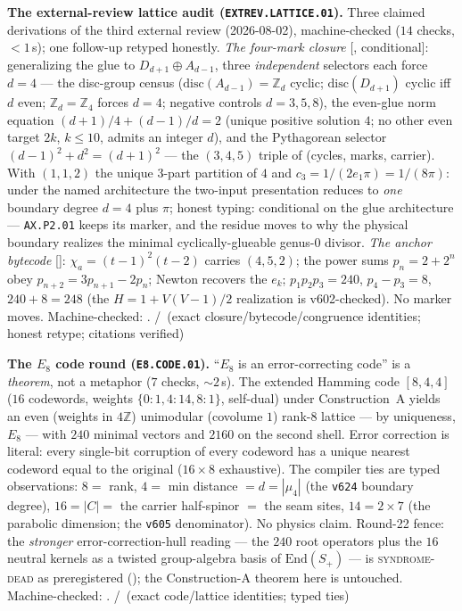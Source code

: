 \documentclass[11pt,a4paper]{article}
\theoremstyle{definition}
\begin{document}
\par\smallskip\noindent\textbf{The external-review lattice audit
(\texttt{EXTREV.LATTICE.01}).}
Three claimed derivations of the third external review (2026-08-02),
machine-checked ($14$ checks, ${<}1$\,s); one follow-up retyped
honestly.  \emph{The four-mark closure} [\mE, conditional]:
generalizing the glue to $D_{d+1}\oplus A_{d-1}$, three
\emph{independent} selectors each force $d=4$ --- the disc-group
census ($\mathrm{disc}(A_{d-1})=\mathbb Z_d$ cyclic;
$\mathrm{disc}(D_{d+1})$ cyclic iff $d$ even; $\mathbb Z_d=\mathbb
Z_4$ forces $d=4$; negative controls $d=3,5,8$), the even-glue norm
equation $(d{+}1)/4+(d{-}1)/d=2$ (unique positive solution $4$; no
other even target $2k$, $k\le10$, admits an integer $d$), and the
Pythagorean selector $(d{-}1)^2+d^2=(d{+}1)^2$ --- the $(3,4,5)$
triple of (cycles, marks, carrier).  With $(1,1,2)$ the unique
3-part partition of $4$ and $c_3=1/(2e_1\pi)=1/(8\pi)$: under the
named architecture the two-input presentation reduces to \emph{one}
boundary degree $d=4$ plus $\pi$; honest typing: conditional on the
glue architecture --- \texttt{AX.P2.01} keeps its marker, and the
residue moves to why the physical boundary realizes the minimal
cyclically-glueable genus-0 divisor.  \emph{The anchor bytecode}
[\mE]: $\chi_a=(t{-}1)^2(t{-}2)$ carries $(4,5,2)$; the power sums
$p_n=2+2^n$ obey $p_{n+2}=3p_{n+1}-2p_n$; Newton recovers the $e_k$;
$p_1p_2p_3=240$, $p_4-p_3=8$, $240+8=248$ (the $H=1+V(V{-}1)/2$
realization is v602-checked).  No marker moves.
Machine-checked: .
\mE/\mC\ (exact closure/bytecode/congruence identities; honest
retype; citations verified)
\par\smallskip

\par\smallskip\noindent\textbf{The $E_8$ code round
(\texttt{E8.CODE.01}).}
``$E_8$ is an error-correcting code'' is a \emph{theorem}, not a
metaphor ($7$ checks, ${\sim}2$\,s).  The extended Hamming code
$[8,4,4]$ ($16$ codewords, weights $\{0{:}1,4{:}14,8{:}1\}$, self-dual)
under Construction~A yields an even (weights in $4\mathbb Z$)
unimodular (covolume $1$) rank-$8$ lattice --- by uniqueness, $E_8$ ---
with $240$ minimal vectors and $2160$ on the second shell.  Error correction is
literal: every single-bit corruption of every codeword has a unique
nearest codeword equal to the original ($16\times8$ exhaustive).  The
compiler ties are typed observations: $8=$ rank, $4=$ min distance
$=d=|\mu_4|$ (the \texttt{v624} boundary degree), $16=|C|=$ the carrier
half-spinor $=$ the seam sites, $14=2\times7$ (the parabolic dimension;
the \texttt{v605} denominator).  No physics claim.  Round-22 fence:
the \emph{stronger} error-correction-hull reading --- the $240$ root
operators plus the $16$ neutral kernels as a twisted group-algebra
basis of $\mathrm{End}(S_+)$ --- is \textsc{syndrome-dead} as
preregistered (); the
Construction-A theorem here is untouched.
Machine-checked: .
\mE/\mC\ (exact code/lattice identities; typed ties)
\par\smallskip
\end{document}
